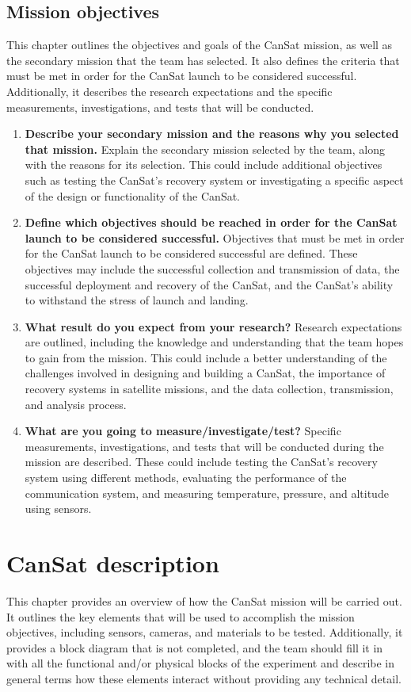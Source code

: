 \documentclass[11pt]{article}
\begin{document}
\subsection{Mission objectives}

This chapter outlines the objectives and goals of the CanSat mission, as well as the secondary mission that the team has selected. It also defines the criteria that must be met in order for the CanSat launch to be considered successful. Additionally, it describes the research expectations and the specific measurements, investigations, and tests that will be conducted.
\begin{enumerate}
  \item {\bf Describe your secondary mission and the reasons why you selected that mission.} Explain the secondary mission selected by the team, along with the reasons for its selection. This could include additional objectives such as testing the CanSat's recovery system or investigating a specific aspect of the design or functionality of the CanSat.
  \item {\bf Define which objectives should be reached in order for the CanSat launch to be considered successful.} Objectives that must be met in order for the CanSat launch to be considered successful are defined. These objectives may include the successful collection and transmission of data, the successful deployment and recovery of the CanSat, and the CanSat's ability to withstand the stress of launch and landing.
  \item {\bf What result do you expect from your research?} Research expectations are outlined, including the knowledge and understanding that the team hopes to gain from the mission. This could include a better understanding of the challenges involved in designing and building a CanSat, the importance of recovery systems in satellite missions, and the data collection, transmission, and analysis process.
  \item {\bf What are you going to measure/investigate/test?} Specific measurements, investigations, and tests that will be conducted during the mission are described. These could include testing the CanSat's recovery system using different methods, evaluating the performance of the communication system, and measuring temperature, pressure, and altitude using sensors.
\end{enumerate}


\section{CanSat description}
This chapter provides an overview of how the CanSat mission will be carried out. It outlines the key elements that will be used to accomplish the mission objectives, including sensors, cameras, and materials to be tested. Additionally, it provides a block diagram that is not completed, and the team should fill it in with all the functional and/or physical blocks of the experiment and describe in general terms how these elements interact without providing any technical detail.
\end{document}
